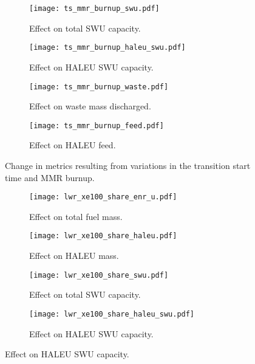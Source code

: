 \begin{figure}
    \ContinuedFloat    
    \begin{subfigure}[b]{0.48\textwidth}
        \centering
        \texttt{[image: ts\_mmr\_burnup\_swu.pdf]}
        \caption{Effect on total SWU capacity.}
        \label{fig:ts_mmr_bu_swu}
    \end{subfigure}
    \hfill
    \begin{subfigure}[b]{0.48\textwidth}
        \centering
        \texttt{[image: ts\_mmr\_burnup\_haleu\_swu.pdf]}
        \caption{Effect on HALEU SWU capacity.}
        \label{fig:ts_mmr_bu_haleu_swu}
    \end{subfigure}
    
    \begin{subfigure}[b]{0.48\textwidth}
        \centering
        \texttt{[image: ts\_mmr\_burnup\_waste.pdf]}
        \caption{Effect on waste mass discharged.}
        \label{fig:ts_mmr_bu_waste}
    \end{subfigure}
    \hfill
    \begin{subfigure}[b]{0.48\textwidth}
        \centering
        \texttt{[image: ts\_mmr\_burnup\_feed.pdf]}
        \caption{Effect on HALEU feed.}
        \label{fig:ts_mmr_bu_feed}
    \end{subfigure}
    \caption{Change in metrics resulting from variations in the 
    transition start time and MMR burnup.}
    \label{fig:ts_mmr_bu}
\end{figure}

\begin{figure}
    \begin{subfigure}[b]{0.48\textwidth}
        \centering
        \texttt{[image: lwr\_xe100\_share\_enr\_u.pdf]}
        \caption{Effect on total fuel mass.}
        \label{fig:lwr_xe100_share_enr_u}
    \end{subfigure}
    \hfill
    \begin{subfigure}[b]{0.48\textwidth}
        \centering
        \texttt{[image: lwr\_xe100\_share\_haleu.pdf]}
        \caption{Effect on HALEU mass.}
        \label{fig:lwr_xe100_share_haleu}
    \end{subfigure}  
    \begin{subfigure}[b]{0.48\textwidth}
        \centering
        \texttt{[image: lwr\_xe100\_share\_swu.pdf]}
        \caption{Effect on total SWU capacity.}
        \label{fig:lwr_xe100_share_swu}
    \end{subfigure}
    \hfill
    \begin{subfigure}[b]{0.48\textwidth}
        \centering
        \texttt{[image: lwr\_xe100\_share\_haleu\_swu.pdf]}
        \caption{Effect on HALEU SWU capacity.}
        \label{fig:lwr_xe100_share_haleu_swu}
    \end{subfigure}
\end{figure}


